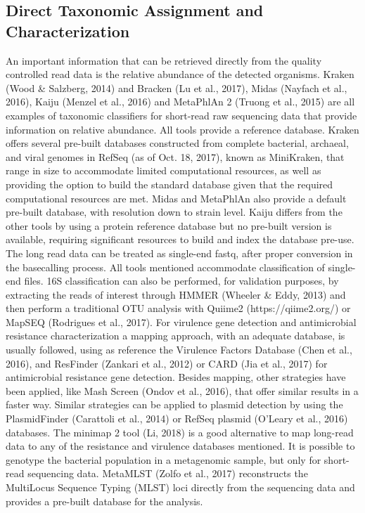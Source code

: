 \subsection{Direct Taxonomic Assignment and Characterization}
An important information that can be retrieved directly from the quality controlled read data is the relative abundance of the detected organisms. Kraken (Wood & Salzberg, 2014) and Bracken (Lu et al., 2017), Midas (Nayfach et al., 2016), Kaiju (Menzel et al., 2016) and MetaPhlAn 2 (Truong et al., 2015) are all examples of taxonomic classifiers for short-read raw sequencing data that provide information on relative abundance. All tools provide a reference database. Kraken offers several pre-built databases constructed from complete bacterial, archaeal, and viral genomes in RefSeq (as of Oct. 18, 2017), known as MiniKraken, that range in size to accommodate limited computational resources, as well as providing the option to build the standard database given that the required computational resources are met. Midas and MetaPhlAn also provide a default pre-built database, with resolution down to strain level. Kaiju differs from the other tools by using a protein reference database but no pre-built version is available, requiring significant resources to build and index the database pre-use. 
The long read data can be treated as single-end fastq, after proper conversion in the basecalling process. All tools mentioned accommodate classification of single-end files. 
16S classification can also be performed, for validation purposes, by extracting the reads of interest through HMMER (Wheeler & Eddy, 2013) and then perform a traditional OTU analysis with Quiime2 (https://qiime2.org/) or MapSEQ (Rodrigues et al., 2017).  
For virulence gene detection and antimicrobial resistance characterization a mapping approach, with an adequate database, is usually followed, using as reference the Virulence Factors Database (Chen et al., 2016), and ResFinder (Zankari et al., 2012) or CARD (Jia et al., 2017) for antimicrobial resistance gene detection. Besides mapping, other strategies have been applied, like Mash Screen (Ondov et al., 2016), that offer similar results in a faster way.  Similar strategies can be applied to plasmid detection by using the PlasmidFinder (Carattoli et al., 2014) or RefSeq plasmid (O’Leary et al., 2016) databases. The minimap 2 tool (Li, 2018) is a good alternative to map long-read data to any of the resistance and virulence databases mentioned. 
It is possible to genotype the bacterial population in a metagenomic sample, but only for short-read sequencing data.  MetaMLST (Zolfo et al., 2017) reconstructs the MultiLocus Sequence Typing (MLST) loci directly from the sequencing data and provides a pre-built database for the analysis.

